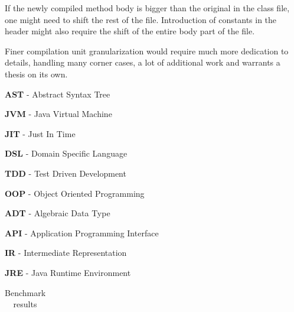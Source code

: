 \documentclass{VUMIFPSbakalaurinis}
\begin{document}
If the newly compiled method body is bigger than the original in the class file, one might need to shift the rest of the file.
Introduction of constants in the header might also require the shift of the entire body part of the file.

Finer compilation unit granularization would require much more dedication to details, handling many corner cases, a lot of additional work and warrants a thesis on its own.
\fi

\printbibliography[heading=bibintoc]



\textbf{AST} - Abstract Syntax Tree

\textbf{JVM} - Java Virtual Machine

\textbf{JIT} - Just In Time

\textbf{DSL} - Domain Specific Language

\textbf{TDD} - Test Driven Development

\textbf{OOP} - Object Oriented Programming

\textbf{ADT} - Algebraic Data Type

\textbf{API} - Application Programming Interface

\textbf{IR} - Intermediate Representation

\textbf{JRE} - Java Runtime Environment

\appendix  %


\begin{center}
	\begin{table}
	  \caption{Benchmark results}
	  \label{tb:benchmarks}

    \begin{tabular}{ c | c || c || c | c | c || c | c | c | c | c | c }
      
    \end{tabular}
  \end{table}
\end{center}
\end{document}
